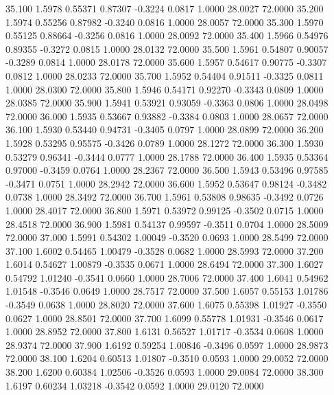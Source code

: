   35.100   1.5978   0.55371   0.87307  -0.3224   0.0817   1.0000  28.0027  72.0000
  35.200   1.5974   0.55256   0.87982  -0.3240   0.0816   1.0000  28.0057  72.0000
  35.300   1.5970   0.55125   0.88664  -0.3256   0.0816   1.0000  28.0092  72.0000
  35.400   1.5966   0.54976   0.89355  -0.3272   0.0815   1.0000  28.0132  72.0000
  35.500   1.5961   0.54807   0.90057  -0.3289   0.0814   1.0000  28.0178  72.0000
  35.600   1.5957   0.54617   0.90775  -0.3307   0.0812   1.0000  28.0233  72.0000
  35.700   1.5952   0.54404   0.91511  -0.3325   0.0811   1.0000  28.0300  72.0000
  35.800   1.5946   0.54171   0.92270  -0.3343   0.0809   1.0000  28.0385  72.0000
  35.900   1.5941   0.53921   0.93059  -0.3363   0.0806   1.0000  28.0498  72.0000
  36.000   1.5935   0.53667   0.93882  -0.3384   0.0803   1.0000  28.0657  72.0000
  36.100   1.5930   0.53440   0.94731  -0.3405   0.0797   1.0000  28.0899  72.0000
  36.200   1.5928   0.53295   0.95575  -0.3426   0.0789   1.0000  28.1272  72.0000
  36.300   1.5930   0.53279   0.96341  -0.3444   0.0777   1.0000  28.1788  72.0000
  36.400   1.5935   0.53364   0.97000  -0.3459   0.0764   1.0000  28.2367  72.0000
  36.500   1.5943   0.53496   0.97585  -0.3471   0.0751   1.0000  28.2942  72.0000
  36.600   1.5952   0.53647   0.98124  -0.3482   0.0738   1.0000  28.3492  72.0000
  36.700   1.5961   0.53808   0.98635  -0.3492   0.0726   1.0000  28.4017  72.0000
  36.800   1.5971   0.53972   0.99125  -0.3502   0.0715   1.0000  28.4518  72.0000
  36.900   1.5981   0.54137   0.99597  -0.3511   0.0704   1.0000  28.5009  72.0000
  37.000   1.5991   0.54302   1.00049  -0.3520   0.0693   1.0000  28.5499  72.0000
  37.100   1.6002   0.54465   1.00479  -0.3528   0.0682   1.0000  28.5993  72.0000
  37.200   1.6014   0.54627   1.00879  -0.3535   0.0671   1.0000  28.6494  72.0000
  37.300   1.6027   0.54792   1.01240  -0.3541   0.0660   1.0000  28.7006  72.0000
  37.400   1.6041   0.54962   1.01548  -0.3546   0.0649   1.0000  28.7517  72.0000
  37.500   1.6057   0.55153   1.01786  -0.3549   0.0638   1.0000  28.8020  72.0000
  37.600   1.6075   0.55398   1.01927  -0.3550   0.0627   1.0000  28.8501  72.0000
  37.700   1.6099   0.55778   1.01931  -0.3546   0.0617   1.0000  28.8952  72.0000
  37.800   1.6131   0.56527   1.01717  -0.3534   0.0608   1.0000  28.9374  72.0000
  37.900   1.6192   0.59254   1.00846  -0.3496   0.0597   1.0000  28.9873  72.0000
  38.100   1.6204   0.60513   1.01807  -0.3510   0.0593   1.0000  29.0052  72.0000
  38.200   1.6200   0.60384   1.02506  -0.3526   0.0593   1.0000  29.0084  72.0000
  38.300   1.6197   0.60234   1.03218  -0.3542   0.0592   1.0000  29.0120  72.0000
